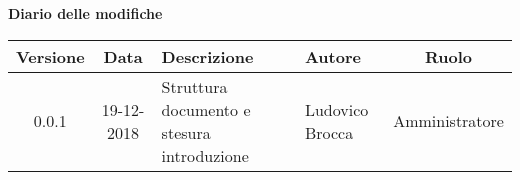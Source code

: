 	\begin{center}
		\textbf{Diario delle modifiche}
	\end{center}
	\begin{center}
		\begin{tabularx}{\textwidth}{|c|c|X|X|c|}
			\hline
			\textbf{Versione} & \textbf{Data} & \textbf{Descrizione} & \textbf{Autore} & \textbf{Ruolo} \\
			\hline
			0.0.1 & 19-12-2018 & Struttura documento e stesura introduzione& Ludovico Brocca & Amministratore\\
			\hline
		\end{tabularx}
	\end{center}
\newpage